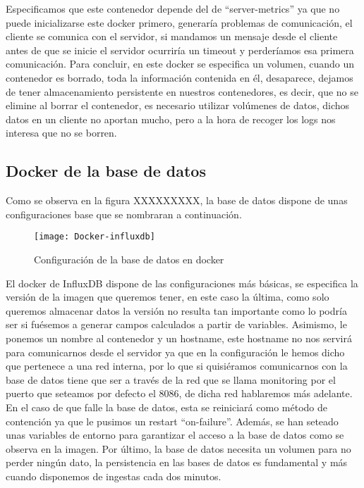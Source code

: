 \documentclass[ spanish, a4paper, 12pt, oneside]{report}
\begin{document}
Especificamos que este contenedor depende del de ``server-metrics'' ya que no puede inicializarse este docker primero, generaría problemas de comunicación, el cliente se comunica con el servidor, si mandamos un mensaje desde el cliente antes de que se inicie el servidor ocurriría un timeout y perderíamos esa primera comunicación. 
Para concluir, en este docker se especifica un volumen, cuando un contenedor es borrado, toda la información contenida en él, desaparece, dejamos de tener almacenamiento persistente en nuestros contenedores, es decir, que no se elimine al borrar el contenedor, es necesario utilizar volúmenes de datos, 
dichos datos en un cliente no aportan mucho, pero a la hora de recoger los logs nos interesa que no se borren.\\

\subsection{Docker de la base de datos}
Como se observa en la figura XXXXXXXXX, la base de datos dispone de unas configuraciones base que se nombraran a continuación.\\

\begin{figure}[!h]
   \centering
   \texttt{[image: Docker-influxdb]}\\
      \caption{\label{fig: Configuración de la base de datos en docker} Configuración de la base de datos en docker}
\end{figure}

El docker de InfluxDB dispone de las configuraciones más básicas, se especifica la versión de la imagen que queremos tener, en este caso la última, como solo queremos almacenar datos la versión no resulta tan importante como lo podría ser si fuésemos a generar campos calculados a partir de variables. Asimismo, le ponemos un nombre al contenedor y un 
hostname, este hostname no nos servirá para comunicarnos desde el servidor ya que en la configuración le hemos dicho que pertenece a una red interna, por lo que si quisiéramos comunicarnos con la base de datos tiene que ser a través de la red que se llama monitoring por el puerto que seteamos por defecto el 8086, de dicha red hablaremos más adelante. En 
el caso de que falle la base de datos, esta se reiniciará como método de contención ya que le pusimos un restart ``on-failure''. Además, se han seteado unas variables de entorno para garantizar el acceso a la base de datos como se observa en la imagen. Por último, la base de datos necesita un volumen para no perder ningún dato, la persistencia en las bases de 
datos es fundamental y más cuando disponemos de ingestas cada dos minutos.\\
\end{document}
